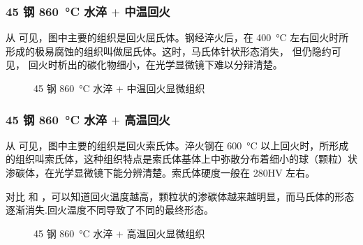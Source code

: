    \subsubsection{45 钢 \SI{860}{\degreeCelsius} 水淬 $+$ 中温回火\label{ss2:45sczw}}
    从 可见，图中主要的组织是回火屈氏体。钢经淬火后，在 \SI{400}{\degreeCelsius} 左右回火时所形成的极易腐蚀的组织叫做屈氏体。这时，马氏体针状形态消失， 但仍隐约可见， 回火时析出的碳化物细小，在光学显微镜下难以分辩清楚。
    \begin{figure}[!ht]
        \hspace{20pt}
        \caption{45 钢 \SI{860}{\degreeCelsius} 水淬 $+$ 中温回火显微组织\label{fig:n8}}
    \end{figure}

    \subsubsection{45 钢 \SI{860}{\degreeCelsius} 水淬 $+$ 高温回火\label{ss2:45scgw}}
    从 可见，图中主要的组织是回火索氏体。淬火钢在 \SI{600}{\degreeCelsius} 以上回火时，所形成的组织叫索氏体，这种组织特点是索氏体基体上中弥散分布着细小的球（颗粒）状渗碳体，在光学显微镜下能分辨清楚。索氏体硬度一般在 280HV 左右。\par
    对比  和  ，可以知道回火温度越高，颗粒状的渗碳体越来越明显，而马氏体的形态逐渐消失.回火温度不同导致了不同的最终形态。
    \begin{figure}[!ht]
        \hspace{20pt}
        \caption{45 钢 \SI{860}{\degreeCelsius} 水淬 $+$ 高温回火显微组织\label{fig:n9}}
    \end{figure}

